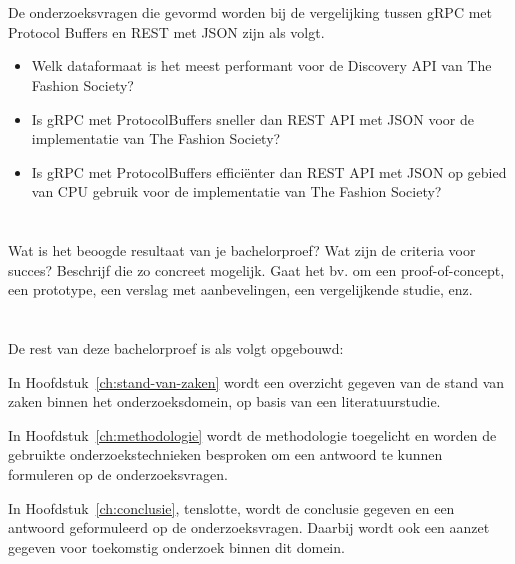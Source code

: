 \section{}
\label{sec:onderzoeksvraag}

De onderzoeksvragen die gevormd worden bij de vergelijking tussen gRPC met Protocol Buffers en REST met JSON zijn als volgt.
\begin{itemize}
    \item Welk dataformaat is het meest performant voor de Discovery API van The Fashion Society?
    \item Is gRPC met ProtocolBuffers sneller dan REST API met JSON voor de implementatie van The Fashion Society?
    \item Is gRPC met ProtocolBuffers efficiënter dan REST API met JSON op gebied van CPU gebruik voor de implementatie van The Fashion Society?
\end{itemize}

\section{}
\label{sec:onderzoeksdoelstelling}

Wat is het beoogde resultaat van je bachelorproef? Wat zijn de criteria voor succes? Beschrijf die zo concreet mogelijk. Gaat het bv. om een proof-of-concept, een prototype, een verslag met aanbevelingen, een vergelijkende studie, enz.

\section{}
\label{sec:opzet-bachelorproef}


De rest van deze bachelorproef is als volgt opgebouwd:

In Hoofdstuk~\ref{ch:stand-van-zaken} wordt een overzicht gegeven van de stand van zaken binnen het onderzoeksdomein, op basis van een literatuurstudie.

In Hoofdstuk~\ref{ch:methodologie} wordt de methodologie toegelicht en worden de gebruikte onderzoekstechnieken besproken om een antwoord te kunnen formuleren op de onderzoeksvragen.


In Hoofdstuk~\ref{ch:conclusie}, tenslotte, wordt de conclusie gegeven en een antwoord geformuleerd op de onderzoeksvragen. Daarbij wordt ook een aanzet gegeven voor toekomstig onderzoek binnen dit domein.